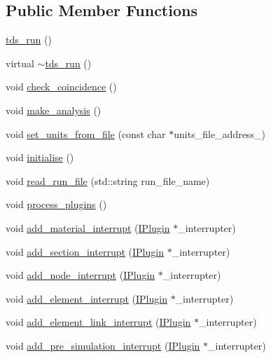 \subsection*{Public Member Functions}
\begin{DoxyCompactItemize}
\item 
\hyperlink{classtds__run_a0ba74f360c64a7e2f3f8959dc1fed2df}{tds\+\_\+run} ()
\item 
virtual \hyperlink{classtds__run_aa2b9a0552e50ff324d03c3d420fff38c}{$\sim$tds\+\_\+run} ()
\item 
void \hyperlink{classtds__run_a9abb2736c161cf2156e3e163a04a0cd4}{check\+\_\+coincidence} ()
\item 
void \hyperlink{classtds__run_a35a3ff44173673f3128e3ef53f2ed88d}{make\+\_\+analysis} ()
\item 
void \hyperlink{classtds__run_abd30ce52c369e4df8604e572d6927284}{set\+\_\+units\+\_\+from\+\_\+file} (const char $\ast$units\+\_\+file\+\_\+address\+\_\+)
\item 
void \hyperlink{classtds__run_ae1603d896969d71fa6547abe35223f61}{initialise} ()
\item 
void \hyperlink{classtds__run_ad032df448d1a63322c2bf79f5a0096b2}{read\+\_\+run\+\_\+file} (std\+::string run\+\_\+file\+\_\+name)
\item 
void \hyperlink{classtds__run_adff2cb3deec1b483622a7dda413dda31}{process\+\_\+plugins} ()
\item 
void \hyperlink{classtds__run_a362d316bd24de6cbf82d5d3da5d4f2c0}{add\+\_\+material\+\_\+interrupt} (\hyperlink{classIPlugin}{I\+Plugin} $\ast$\+\_\+interrupter)
\item 
void \hyperlink{classtds__run_a3839266313d0fc9e3413c28dda530482}{add\+\_\+section\+\_\+interrupt} (\hyperlink{classIPlugin}{I\+Plugin} $\ast$\+\_\+interrupter)
\item 
void \hyperlink{classtds__run_ab6675a0bebfd5bed698acd4dea878d41}{add\+\_\+node\+\_\+interrupt} (\hyperlink{classIPlugin}{I\+Plugin} $\ast$\+\_\+interrupter)
\item 
void \hyperlink{classtds__run_a312b07f0d3efffd1642dfa87895ff4cc}{add\+\_\+element\+\_\+interrupt} (\hyperlink{classIPlugin}{I\+Plugin} $\ast$\+\_\+interrupter)
\item 
void \hyperlink{classtds__run_ac40a3ad881c24c25897bd1b09d78a078}{add\+\_\+element\+\_\+link\+\_\+interrupt} (\hyperlink{classIPlugin}{I\+Plugin} $\ast$\+\_\+interrupter)
\item 
void \hyperlink{classtds__run_ab4ec00a4d9f22819365b66477c10ae91}{add\+\_\+pre\+\_\+simulation\+\_\+interrupt} (\hyperlink{classIPlugin}{I\+Plugin} $\ast$\+\_\+interrupter)

\end{DoxyCompactItemize}
